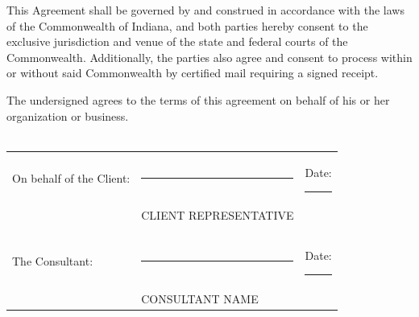 \documentclass[10pt]{article}
\begin{document}
This Agreement shall be governed by and construed in accordance with the
laws of the Commonwealth of Indiana, and both parties hereby consent
to the exclusive jurisdiction and venue of the state and federal courts of
the Commonwealth. Additionally, the parties also agree and consent to
process within or without said Commonwealth by certified mail requiring a
signed receipt.

\vspace{1cm} 

\noindent The undersigned agrees to the terms of this agreement on behalf of his or
her organization or business.\\\\

\noindent \begin{tabular}{l l l}
On behalf of the Client: & \rule{6cm}{.2pt} & Date: \rule{2.4cm}{.2pt}\\
                         & CLIENT REPRESENTATIVE      & \\\\\\
The Consultant:          & \rule{6cm}{.2pt} & Date: \rule{2.4cm}{.2pt}\\
                         & CONSULTANT NAME      & \\
\end{tabular}
\end{document}
